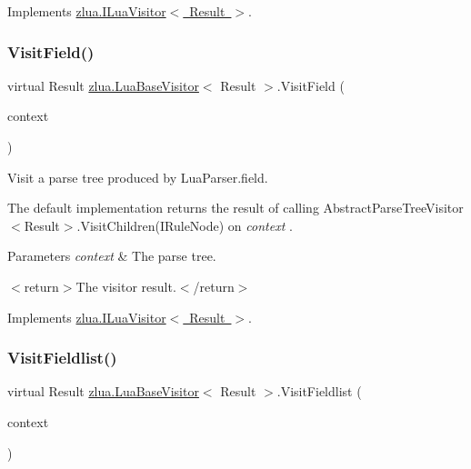 Implements \mbox{\hyperlink{interfacezlua_1_1_i_lua_visitor_ad1a1446a4713b3b0e796d4e15e6946fc}{zlua.\+I\+Lua\+Visitor$<$ Result $>$}}.

\mbox{\label{classzlua_1_1_lua_base_visitor_a4088fd943be175aab9ed0830ce42127f}} 
\subsubsection{\texorpdfstring{Visit\+Field()}{VisitField()}}
{\footnotesize\ttfamily virtual Result \mbox{\hyperlink{classzlua_1_1_lua_base_visitor}{zlua.\+Lua\+Base\+Visitor}}$<$ Result $>$.Visit\+Field (\begin{DoxyParamCaption}\item[{\mbox{[}\+Not\+Null\mbox{]} \mbox{\hyperlink{classzlua_1_1_lua_parser_1_1_field_context}{Lua\+Parser.\+Field\+Context}}}]{context }\end{DoxyParamCaption})\hspace{0.3cm}{\ttfamily [virtual]}}



Visit a parse tree produced by Lua\+Parser.\+field. 

The default implementation returns the result of calling Abstract\+Parse\+Tree\+Visitor$<$\+Result$>$.\+Visit\+Children(\+I\+Rule\+Node) on {\itshape context} . 


\begin{DoxyParams}{Parameters}
{\em context} & The parse tree.\\
\hline
\end{DoxyParams}
$<$return$>$The visitor result.$<$/return$>$ 

Implements \mbox{\hyperlink{interfacezlua_1_1_i_lua_visitor_ae8386424ca34e372ed88360de953a962}{zlua.\+I\+Lua\+Visitor$<$ Result $>$}}.

\mbox{\label{classzlua_1_1_lua_base_visitor_a743339d1d6b13b9a3c334604cbae43e0}} 
\subsubsection{\texorpdfstring{Visit\+Fieldlist()}{VisitFieldlist()}}
{\footnotesize\ttfamily virtual Result \mbox{\hyperlink{classzlua_1_1_lua_base_visitor}{zlua.\+Lua\+Base\+Visitor}}$<$ Result $>$.Visit\+Fieldlist (\begin{DoxyParamCaption}\item[{\mbox{[}\+Not\+Null\mbox{]} \mbox{\hyperlink{classzlua_1_1_lua_parser_1_1_fieldlist_context}{Lua\+Parser.\+Fieldlist\+Context}}}]{context }\end{DoxyParamCaption})\hspace{0.3cm}{\ttfamily [virtual]}}



